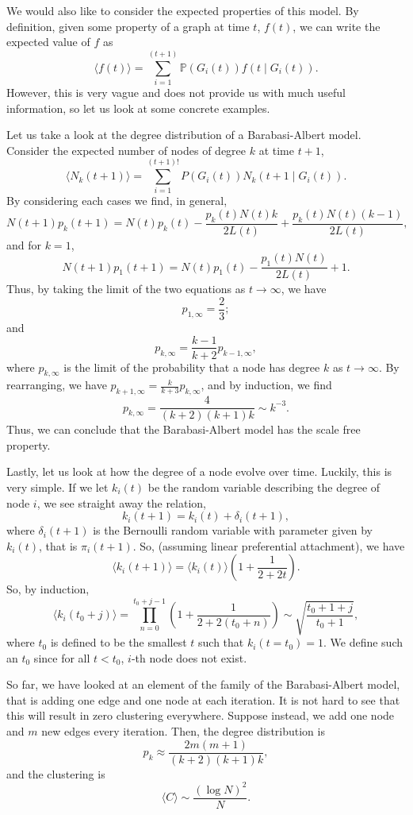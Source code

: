 \documentclass[
]{article}
\theoremstyle{definition}
\theoremstyle{definition}
\begin{document}
We would also like to consider the expected properties of this model. By
definition, given some property of a graph at time \(t\), \(f(t)\), we
can write the expected value of \(f\) as
\[\langle f(t) \rangle = \sum_{i = 1}^{(t + 1)}\mathbb{P}(G_i(t))f(t \mid G_i(t)).\]
However, this is very vague and does not provide us with much useful
information, so let us look at some concrete examples.

Let us take a look at the degree distribution of a Barabasi-Albert
model. Consider the expected number of nodes of degree \(k\) at time
\(t + 1\), \[
\langle N_k(t + 1) \rangle = \sum_{i = 1}^{(t + 1)!} P(G_i(t)) N_k(t + 1 \mid G_i(t)).
\] By considering each cases we find, in general, \[
N(t + 1)p_k(t + 1) = N(t)p_k(t) - \frac{p_k(t)N(t)k}{2L(t)} + \frac{p_k(t)N(t)(k - 1)}{2L(t)},
\] and for \(k = 1\), \[
N(t + 1)p_1(t + 1) = N(t)p_1(t) - \frac{p_1(t)N(t)}{2L(t)} + 1.
\] Thus, by taking the limit of the two equations as \(t \to \infty\),
we have \[p_{1, \infty} = \frac{2}{3};\] and
\[p_{k, \infty} = \frac{k - 1}{k + 2}p_{k - 1, \infty},\] where
\(p_{k, \infty}\) is the limit of the probability that a node has degree
\(k\) as \(t \to \infty\). By rearranging, we have
\(p_{k + 1, \infty} = \frac{k}{k + 3}p_{k, \infty}\), and by induction,
we find \[p_{k, \infty} = \frac{4}{(k + 2)(k + 1)k} \sim k^{-3}.\] Thus,
we can conclude that the Barabasi-Albert model has the scale free
property.

Lastly, let us look at how the degree of a node evolve over time.
Luckily, this is very simple. If we let \(k_i(t)\) be the random
variable describing the degree of node \(i\), we see straight away the
relation, \[k_i(t + 1) = k_i(t) + \delta_i(t + 1),\] where
\(\delta_i(t + 1)\) is the Bernoulli random variable with parameter
given by \(k_i(t)\), that is \(\pi_i(t + 1)\). So, (assuming linear
preferential attachment), we have
\[\langle k_i(t + 1) \rangle = \langle k_i(t) \rangle\left(1 + \frac{1}{2 + 2t}\right).\]
So, by induction, \[\langle k_i(t_0 + j) \rangle = 
  \prod_{n = 0}^{t_0 + j - 1}\left( 1 + \frac{1}{2 + 2(t_0 + n)} \right)
  \sim \sqrt{\frac{t_0 + 1 + j}{t_0 + 1}},\] where \(t_0\) is defined to
be the smallest \(t\) such that \(k_i(t = t_0) = 1\). We define such an
\(t_0\) since for all \(t < t_0\), \(i\)-th node does not exist.

So far, we have looked at an element of the family of the
Barabasi-Albert model, that is adding one edge and one node at each
iteration. It is not hard to see that this will result in zero
clustering everywhere. Suppose instead, we add one node and \(m\) new
edges every iteration. Then, the degree distribution is
\[p_k \approx \frac{2m(m + 1)}{(k + 2)(k + 1)k},\] and the clustering is
\[\langle C \rangle \sim \frac{(\log N)^2}{N}.\]
\end{document}

